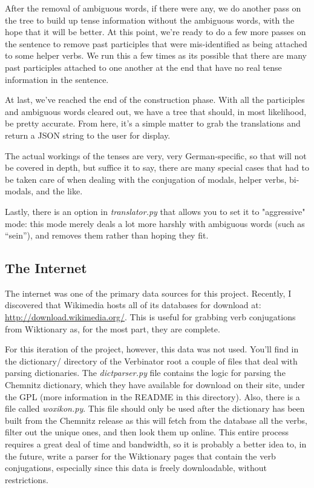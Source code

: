 \documentclass[12pt]{article}
\begin{document}
After the removal of ambiguous words, if there were any, we do another pass on the tree to build
up tense information without the ambiguous words, with the hope that it will be better.  At this
point, we're ready to do a few more passes on the sentence to remove past participles that were
mis-identified as being attached to some helper verbs.  We run this a few times as its possible
that there are many past participles attached to one another at the end that have no real tense
information in the sentence.

At last, we've reached the end of the construction phase.  With all the participles and ambiguous
words cleared out, we have a tree that should, in most likelihood, be pretty accurate.  From here, 
it's a simple matter to grab the translations and return a JSON string to the user for display.

The actual workings of the tenses are very, very German-specific, so that will not be covered in depth,
but suffice it to say, there are many special cases that had to be taken care of when dealing with the
conjugation of modals, helper verbs, bi-modals, and the like.

Lastly, there is an option in \emph{translator.py} that allows you to set it to "aggressive" mode:
this mode merely deals a lot more harshly with ambiguous words (such as ``sein''), and removes them
rather than hoping they fit.

\subsection{The Internet}

The internet was one of the primary data sources for this project.  Recently, I discovered that Wikimedia
hosts all of its databases for download at: \url{http://download.wikimedia.org/}.  This is useful for grabbing
verb conjugations from Wiktionary as, for the most part, they are complete.

For this iteration of the project, however, this data was not used.  You'll find in the dictionary/
directory of the Verbinator root a couple of files that deal with parsing dictionaries.  The
\emph{dictparser.py} file contains the logic for parsing the Chemnitz dictionary, which they have
available for download on their site, under the GPL (more information in the README in this directory).
Also, there is a file called \emph{woxikon.py}.  This file should only be used after the dictionary
has been built from the Chemnitz release as this will fetch from the database all the verbs, filter
out the unique ones, and then look them up online.  This entire process requires a great deal of time
and bandwidth, so it is probably a better idea to, in the future, write a parser for the Wiktionary
pages that contain the verb conjugations, especially since this data is freely downloadable, without
restrictions.
\end{document}
